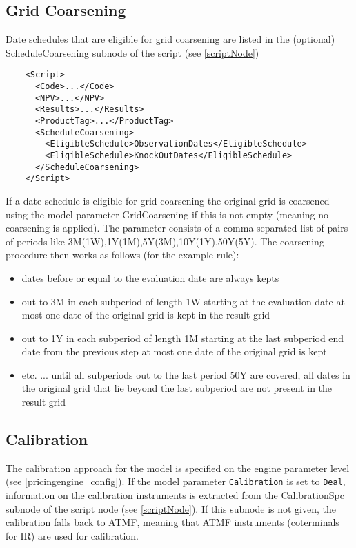 \subsection{Grid Coarsening}\label{grid_coarsening}

Date schedules that are eligible for grid coarsening are listed in the (optional) ScheduleCoarsening subnode of the
script (see \ref{scriptNode})

\begin{verbatim}
    <Script>
      <Code>...</Code>
      <NPV>...</NPV>
      <Results>...</Results>
      <ProductTag>...</ProductTag>
      <ScheduleCoarsening>
        <EligibleSchedule>ObservationDates</EligibleSchedule>
        <EligibleSchedule>KnockOutDates</EligibleSchedule>
      </ScheduleCoarsening>
    </Script>
\end{verbatim}

If a date schedule is eligible for grid coarsening the original grid is coarsened using the model parameter
GridCoarsening if this is not empty (meaning no coarsening is applied). The parameter consists of a comma separated list
of pairs of periods like 3M(1W),1Y(1M),5Y(3M),10Y(1Y),50Y(5Y). The coarsening procedure then works as follows (for the
example rule):

\begin{itemize}
\item dates before or equal to the evaluation date are always kepts
\item out to 3M in each subperiod of length 1W starting at the evaluation date at most one date of the original grid is
  kept in the result grid
\item out to 1Y in each subperiod of length 1M starting at the last subperiod end date from the previous step at most
  one date of the original grid is kept
\item etc. ... until all subperiods out to the last period 50Y are covered, all dates in the original grid that lie
  beyond the last subperiod are not present in the result grid
\end{itemize}

\subsection{Calibration}\label{calibration}

The calibration approach for the model is specified on the engine parameter level (see \ref{pricingengine_config}). If
the model parameter \verb+Calibration+ is set to \verb+Deal+, information on the calibration instruments is extracted
from the CalibrationSpc subnode of the script node (see \ref{scriptNode}). If this subnode is not given, the calibration
falls back to ATMF, meaning that ATMF instruments (coterminals for IR) are used for calibration.

